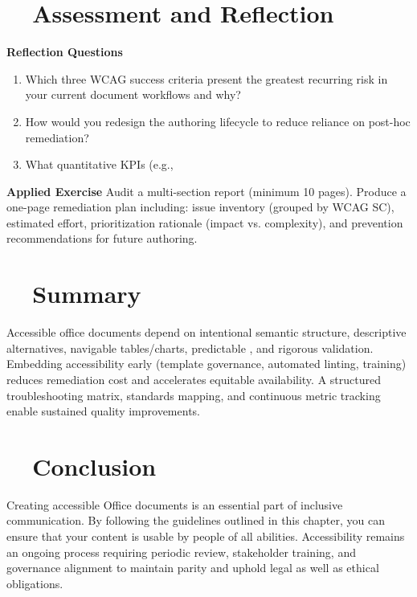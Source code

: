 \section{~~Assessment and Reflection}\label{ch15:sec:assessment-reflection}
\textbf{Reflection Questions}
\begin{enumerate}
	\item Which three WCAG success criteria present the greatest recurring risk in your current document workflows and why?
	\item How would you redesign the authoring lifecycle to reduce reliance on post-hoc remediation?
	\item What quantitative KPIs (e.g., %
\end{enumerate}
\textbf{Applied Exercise} Audit a multi-section report (minimum 10 pages). Produce a one-page remediation plan including: issue inventory (grouped by WCAG SC), estimated effort, prioritization rationale (impact vs. complexity), and prevention recommendations for future authoring.

\section{~~Summary}\label{ch15:sec:summary}
Accessible office documents depend on intentional semantic structure, descriptive alternatives, navigable tables/charts, predictable , and rigorous validation. Embedding accessibility early (template governance, automated linting, training) reduces remediation cost and accelerates equitable availability. A structured troubleshooting matrix, standards mapping, and continuous metric tracking enable sustained quality improvements.

\section{~~Conclusion}\label{ch15:sec:conclusion}
Creating accessible Office documents is an essential part of inclusive communication. By following the guidelines outlined in this chapter, you can ensure that your content is usable by people of all abilities. Accessibility remains an ongoing process requiring periodic review, stakeholder training, and governance alignment to maintain parity and uphold legal as well as ethical obligations.
